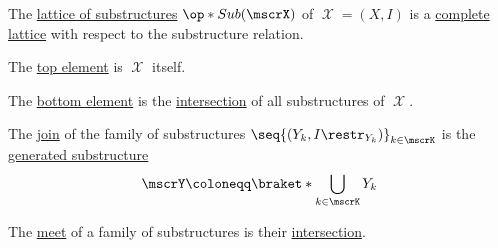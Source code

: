 \begin{proposition}\label{thm:fol_lattice_of_substructures}
  The \hyperref[def:fol_lattice_of_substructures]{lattice of substructures} \( \op*{Sub}(\mscrX) \) of \( \mscrX = (X, I) \) is a \hyperref[def:complete_lattice]{complete lattice} with respect to the substructure relation.

  \begin{thmenum}
     The \hyperref[def:extremal_points/top_and_bottom]{top element} is \( \mscrX \) itself.

     The \hyperref[def:extremal_points/top_and_bottom]{bottom element} is the \hyperref[def:fol_intersection_substructure]{intersection} of all substructures of \( \mscrX \).

     The \hyperref[def:lattice]{join} of the family of substructures \( \seq{ (Y_k, I\restr_{Y_k}) }_{k \in \mscrK} \) is the \hyperref[def:fol_generated_substructure]{generated substructure}
    \begin{equation*}
      \mscrY \coloneqq \braket*{ \bigcup_{k \in \mscrK} Y_k }
    \end{equation*}

     The \hyperref[def:lattice]{meet} of a family of substructures is their \hyperref[def:fol_intersection_substructure]{intersection}.
  \end{thmenum}
\end{proposition}
